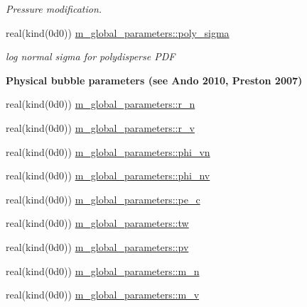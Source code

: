 \begin{Indent}
\begin{DoxyCompactItemize}
\begin{DoxyCompactList}\small\item\em Pressure modification. \end{DoxyCompactList}\item 
real(kind(0d0)) \hyperlink{namespacem__global__parameters_a29164826db891e5662ce2bccdbc57d3c}{m\+\_\+global\+\_\+parameters\+::poly\+\_\+sigma}
\begin{DoxyCompactList}\small\item\em log normal sigma for polydisperse P\+DF \end{DoxyCompactList}\end{DoxyCompactItemize}
\end{Indent}
\begin{Indent}\textbf{ Physical bubble parameters (see Ando 2010, Preston 2007)}\par
\begin{DoxyCompactItemize}
\item 
real(kind(0d0)) \hyperlink{namespacem__global__parameters_ae818e88601b1dc579a87e7c0c8cd87cb}{m\+\_\+global\+\_\+parameters\+::r\+\_\+n}
\item 
real(kind(0d0)) \hyperlink{namespacem__global__parameters_af2ee1ad578115833bb6b8e9550eb5f18}{m\+\_\+global\+\_\+parameters\+::r\+\_\+v}
\item 
real(kind(0d0)) \hyperlink{namespacem__global__parameters_acc6771df62005731bbec282b0c9a5659}{m\+\_\+global\+\_\+parameters\+::phi\+\_\+vn}
\item 
real(kind(0d0)) \hyperlink{namespacem__global__parameters_a7dbd1ec1fd1ece4e997a825fa07785eb}{m\+\_\+global\+\_\+parameters\+::phi\+\_\+nv}
\item 
real(kind(0d0)) \hyperlink{namespacem__global__parameters_ac1375e5145e018847d9025e83e58b49d}{m\+\_\+global\+\_\+parameters\+::pe\+\_\+c}
\item 
real(kind(0d0)) \hyperlink{namespacem__global__parameters_aa77b0836fe22478b69e10e656ef7fcc2}{m\+\_\+global\+\_\+parameters\+::tw}
\item 
real(kind(0d0)) \hyperlink{namespacem__global__parameters_acc5b8b153cee23d65a886df38f821f08}{m\+\_\+global\+\_\+parameters\+::pv}
\item 
real(kind(0d0)) \hyperlink{namespacem__global__parameters_a5600a60608bd352783350438a2efb0fe}{m\+\_\+global\+\_\+parameters\+::m\+\_\+n}
\item 
real(kind(0d0)) \hyperlink{namespacem__global__parameters_a35a6f248eec9c489110fad19d906bd40}{m\+\_\+global\+\_\+parameters\+::m\+\_\+v}

\end{DoxyCompactItemize}
\end{Indent}
